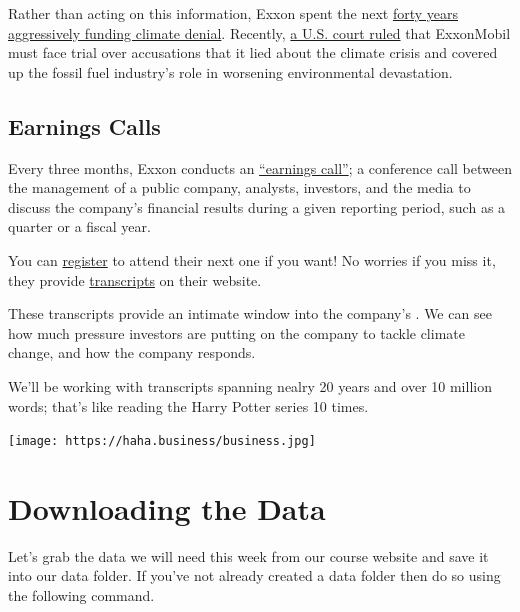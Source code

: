 \documentclass[
  letterpaper,
  DIV=11,
  numbers=noendperiod]{scrreprt}
\begin{document}
Rather than acting on this information, Exxon spent the next
\href{https://news.harvard.edu/gazette/story/2021/09/oil-companies-discourage-climate-action-study-says/}{forty
years aggressively funding climate denial}. Recently,
\href{https://www.theguardian.com/environment/2022/may/24/exxon-trial-climate-crimes-fossil-fuels-global-heating}{a
U.S. court ruled} that ExxonMobil must face trial over accusations that
it lied about the climate crisis and covered up the fossil fuel
industry's role in worsening environmental devastation.

\hypertarget{earnings-calls}{%
\subsection{Earnings Calls}\label{earnings-calls}}

Every three months, Exxon conducts an
\href{https://www.investopedia.com/terms/e/earnings-call.asp}{``earnings
call''}; a conference call between the management of a public company,
analysts, investors, and the media to discuss the company's financial
results during a given reporting period, such as a quarter or a fiscal
year.

You can
\href{https://globalmeet.webcasts.com/starthere.jsp?ei=1488251\&tp_key=440e363aaf}{register}
to attend their next one if you want! No worries if you miss it, they
provide
\href{https://corporate.exxonmobil.com/Investors/Investor-relations/Investor-materials-archive\#Quarterlyearningsmaterials}{transcripts}
on their website.

These transcripts provide an intimate window into the company's . We can
see how much pressure investors are putting on the company to tackle
climate change, and how the company responds.

We'll be working with transcripts spanning nealry 20 years and over 10
million words; that's like reading the Harry Potter series 10 times.

\texttt{[image: https://haha.business/business.jpg]}

\hypertarget{downloading-the-data-1}{%
\section{Downloading the Data}\label{downloading-the-data-1}}

Let's grab the data we will need this week from our course website and
save it into our data folder. If you've not already created a data
folder then do so using the following command.
\end{document}
